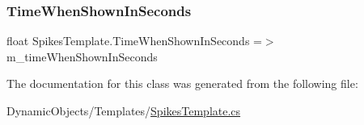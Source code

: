 \subsubsection{\texorpdfstring{Time\+When\+Shown\+In\+Seconds}{TimeWhenShownInSeconds}}
{\footnotesize\ttfamily float Spikes\+Template.\+Time\+When\+Shown\+In\+Seconds =$>$ m\+\_\+time\+When\+Shown\+In\+Seconds}



The documentation for this class was generated from the following file\+:\begin{DoxyCompactItemize}
\item 
Dynamic\+Objects/\+Templates/\mbox{\hyperlink{_spikes_template_8cs}{Spikes\+Template.\+cs}}\end{DoxyCompactItemize}
